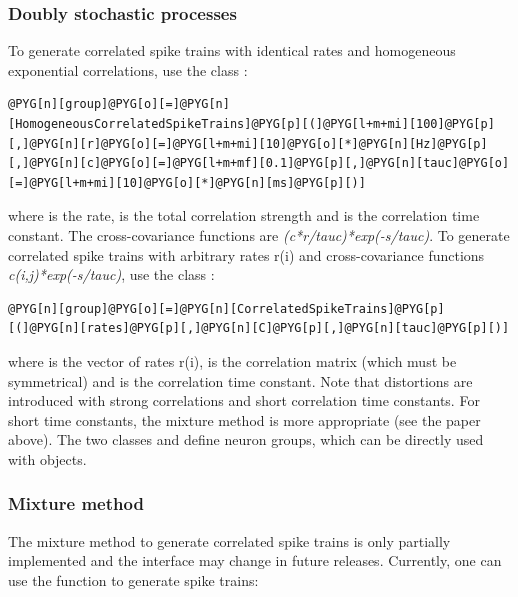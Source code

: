\documentclass[letterpaper,10pt,english]{manual}
\begin{document}
\subsubsection{Doubly stochastic processes}

To generate correlated spike trains with identical rates and homogeneous exponential correlations,
use the class :

\begin{Verbatim}[commandchars=@\[\]]
@PYG[n][group]@PYG[o][=]@PYG[n][HomogeneousCorrelatedSpikeTrains]@PYG[p][(]@PYG[l+m+mi][100]@PYG[p][,]@PYG[n][r]@PYG[o][=]@PYG[l+m+mi][10]@PYG[o][*]@PYG[n][Hz]@PYG[p][,]@PYG[n][c]@PYG[o][=]@PYG[l+m+mf][0.1]@PYG[p][,]@PYG[n][tauc]@PYG[o][=]@PYG[l+m+mi][10]@PYG[o][*]@PYG[n][ms]@PYG[p][)]
\end{Verbatim}

where  is the rate,  is the total correlation strength and  is the correlation time constant.
The cross-covariance functions are \emph{(c*r/tauc)*exp(-\textbar{}s\textbar{}/tauc)}.
To generate correlated spike trains with arbitrary rates r(i) and
cross-covariance functions \emph{c(i,j)*exp(-\textbar{}s\textbar{}/tauc)}, use the class :

\begin{Verbatim}[commandchars=@\[\]]
@PYG[n][group]@PYG[o][=]@PYG[n][CorrelatedSpikeTrains]@PYG[p][(]@PYG[n][rates]@PYG[p][,]@PYG[n][C]@PYG[p][,]@PYG[n][tauc]@PYG[p][)]
\end{Verbatim}

where  is the vector of rates r(i),  is the correlation matrix (which must be
symmetrical) and  is the correlation time constant. Note that distortions are introduced
with strong correlations and short correlation time constants. For short time constants,
the mixture method is more appropriate (see the paper above).
The two classes  and 
define neuron groups, which can be directly used with \hyperlink{brian.Connection}{} objects.


\subsubsection{Mixture method}

The mixture method to generate correlated spike trains is only partially implemented and the
interface may change in future releases. Currently, one can use the function
 to generate spike trains:
\end{document}
